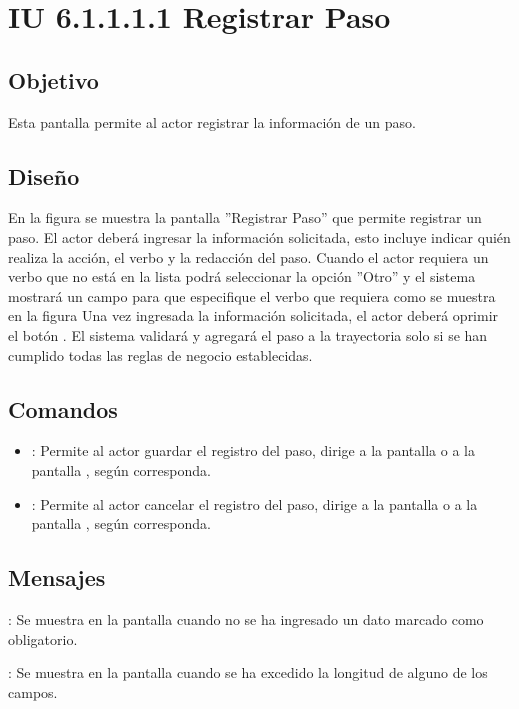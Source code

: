 \section{IU 6.1.1.1.1 Registrar Paso}

\subsection{Objetivo}
	Esta pantalla permite al actor registrar la información de un paso.
\subsection{Diseño}
	En la figura  se muestra la pantalla ''Registrar Paso'' que permite registrar un paso. El actor deberá ingresar la información solicitada, esto incluye indicar quién realiza la acción, el verbo y la redacción del paso.
	Cuando el actor requiera un verbo que no está en la lista podrá seleccionar la opción ''Otro'' y el sistema mostrará un campo para que especifique el verbo que requiera como se muestra en la figura 
	Una vez ingresada la información solicitada, el actor deberá oprimir el botón  . El sistema validará y agregará el paso a la trayectoria solo si se han cumplido todas las reglas de negocio establecidas.

\subsection{Comandos}
\begin{itemize}
	\item {}: Permite al actor guardar el registro del paso, dirige a la pantalla  o a la pantalla , según corresponda.
	\item {}: Permite al actor cancelar el registro del paso, dirige a la pantalla  o a la pantalla , según corresponda.
\end{itemize}

\subsection{Mensajes}

\begin{Citemize}
	\item {}: Se muestra en la pantalla  cuando no se ha ingresado un dato marcado como obligatorio.
	\item {}: Se muestra en la pantalla  cuando se ha excedido la longitud de alguno de los campos.
\end{Citemize}
